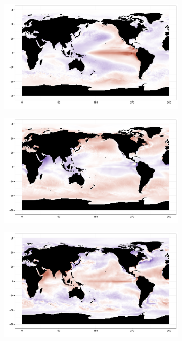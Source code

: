\begin{figure}[h!bt]
\begin{subfigure}{.3\textwidth}
  \end{subfigure}
  \begin{subfigure}{.3\textwidth}
    \centering
    \includegraphics[width=.9\linewidth]{images/EOF3_55.pdf}
  \end{subfigure}
  \begin{subfigure}{.3\textwidth}
    \centering
    \includegraphics[width=.9\linewidth]{images/EOF6_55.pdf}
  \end{subfigure}
  \begin{subfigure}{.3\textwidth}
    \centering
    \includegraphics[width=.9\linewidth]{images/EOF7_55.pdf}

\end{subfigure}
\end{figure}
